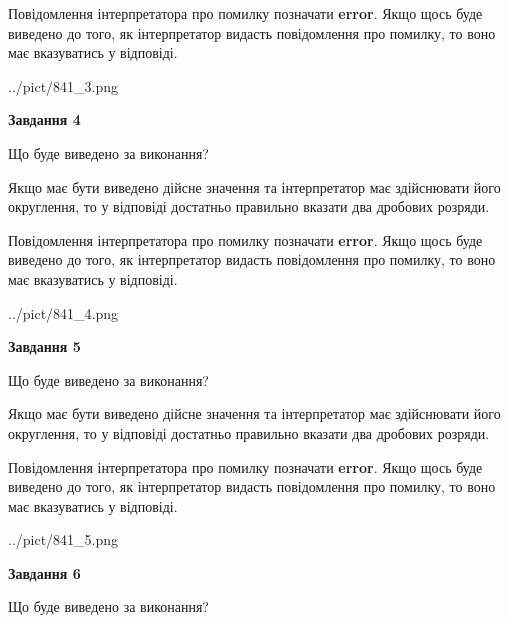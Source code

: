 \documentclass[12pt, ukrainian]{article}
\begin{document}
{\begin {Large}
Повідомлення інтерпретатора про помилку позначати \textbf{error}.
Якщо щось буде виведено до того, як інтерпретатор видасть повідомлення про помилку, 
то воно має вказуватись у відповіді. \par

\begin{center}
	{../pict/841_3.png}
\end{center}
\newpage

{\begin {center}\textbf{Завдання 4}\end {center}}\par
Що буде виведено за виконання? \par

Якщо має бути виведено дійсне значення та інтерпретатор має здійснювати його округлення, 
то у відповіді достатньо правильно вказати два дробових розряди.

Повідомлення інтерпретатора про помилку позначати \textbf{error}.
Якщо щось буде виведено до того, як інтерпретатор видасть повідомлення про помилку, 
то воно має вказуватись у відповіді. \par

\begin{center}
	{../pict/841_4.png}
\end{center}
\newpage

{\begin {center}\textbf{Завдання 5}\end {center}}\par
Що буде виведено за виконання? \par

Якщо має бути виведено дійсне значення та інтерпретатор має здійснювати його округлення, 
то у відповіді достатньо правильно вказати два дробових розряди.

Повідомлення інтерпретатора про помилку позначати \textbf{error}.
Якщо щось буде виведено до того, як інтерпретатор видасть повідомлення про помилку, 
то воно має вказуватись у відповіді. \par

\begin{center}
	{../pict/841_5.png}
\end{center}
\newpage

{\begin {center}\textbf{Завдання 6}\end {center}}\par
Що буде виведено за виконання? \par


\end{Large}}
\end{document}

